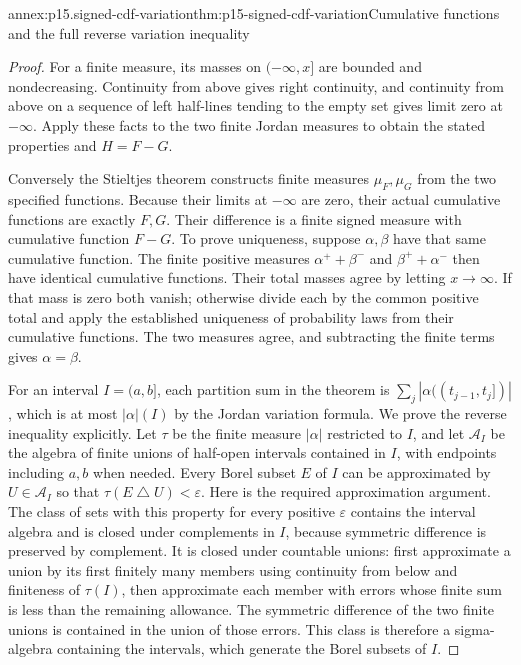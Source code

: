\begin{annexitem}{annex:p15.signed-cdf-variation}{thm:p15-signed-cdf-variation}{Cumulative functions and the full reverse variation inequality}
\begin{proof}
For a finite measure, its masses on \((-\infty,x]\) are bounded and
nondecreasing. Continuity from above gives right continuity, and
continuity from above on a sequence of left half-lines tending to the
empty set gives limit zero at \(-\infty\).
Apply these facts to the two finite Jordan measures to obtain the
stated properties and \(H=F-G\).

Conversely the Stieltjes theorem constructs finite measures \(\mu_F,\mu_G\)
from the two specified functions. Because their limits at \(-\infty\)
are zero, their actual cumulative functions are exactly \(F,G\).
Their difference is a finite signed measure with cumulative function
\(F-G\). To prove uniqueness, suppose \(\alpha,\beta\) have that
same cumulative function. The finite positive measures
\(\alpha^++\beta^-\) and \(\beta^++\alpha^-\) then have identical
cumulative functions. Their total masses agree by letting \(x\to\infty\).
If that mass is zero both vanish; otherwise divide each by the common
positive total and apply the established uniqueness of probability laws
from their cumulative functions. The two measures agree, and subtracting
the finite terms gives \(\alpha=\beta\).

For an interval \(I=(a,b]\), each partition sum in the theorem is
\(\sum_j|\alpha((t_{j-1},t_j])|\), which is at most
\(\lvert\alpha\rvert(I)\) by the Jordan variation formula.
We prove the reverse inequality explicitly.
Let \(\tau\) be the finite measure \(\lvert\alpha\rvert\) restricted
to \(I\), and let \(\mathcal A_I\) be the algebra of finite unions of
half-open intervals contained in \(I\), with endpoints including \(a,b\)
when needed.
Every Borel subset \(E\) of \(I\) can be approximated by \(U\in\mathcal A_I\)
so that \(\tau(E\mathbin{\triangle}U)<\varepsilon\).
Here is the required approximation argument.
The class of sets with this property for every positive \(\varepsilon\)
contains the interval algebra and is closed under complements in \(I\),
because symmetric difference is preserved by complement.
It is closed under countable unions: first approximate a union by its
first finitely many members using continuity from below and finiteness
of \(\tau(I)\), then approximate each member with errors whose finite sum
is less than the remaining allowance. The symmetric difference of the
two finite unions is contained in the union of those errors.
This class is therefore a sigma-algebra containing the intervals,
which generate the Borel subsets of \(I\).


\end{proof}
\end{annexitem}
